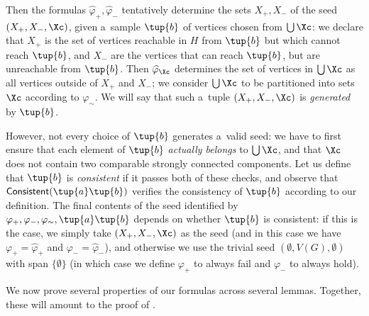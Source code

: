 Then the formulas $\widehat{\varphi}_+, \widehat{\varphi}_-$ tentatively determine the sets $X_+, X_-$ of the seed $(X_+, X_-, \Xc)$, given a~sample $\tup{b}$ of vertices chosen from $\bigcup \Xc$: we declare that $X_+$ is the set of vertices reachable in $H$ from $\tup{b}$ but which cannot reach $\tup{b}$, and $X_-$ are the vertices that can reach $\tup{b}$, but are unreachable from $\tup{b}$.
Then $\widehat{\varphi}_\Xc$ determines the set of vertices in $\bigcup \Xc$ as all vertices outside of $X_+$ and $X_-$; we consider $\bigcup \Xc$ to be partitioned into sets $\Xc$ according to $\varphi_\sim$.
We will say that such a~tuple $(X_+, X_-, \Xc)$ is \emph{generated} by $\tup{b}$.

However, not every choice of $\tup{b}$ generates a~valid seed: we have to first ensure that each element of $\tup{b}$ \emph{actually belongs} to $\bigcup \Xc$, and that $\Xc$ does not contain two comparable strongly connected components.
Let us define that $\tup{b}$ is \emph{consistent} if it passes both of these checks, and observe that $\IsConsistent(\tup{a}\tup{b})$ verifies the consistency of $\tup{b}$ according to our definition.
The final contents of the seed identified by $\varphi_+, \varphi_-, \varphi_\sim, \tup{a}\tup{b}$ depends on whether $\tup{b}$ is consistent: if this is the case, we simply take $(X_+, X_-, \Xc)$ as the seed (and in this case we have $\varphi_+ = \widehat{\varphi}_+$ and $\varphi_- = \widehat{\varphi}_-$), and otherwise we use the trivial seed $(\emptyset, V(G), \emptyset)$ with span $\{\emptyset\}$ (in which case we define $\varphi_+$ to always fail and $\varphi_-$ to always hold).

We now prove several properties of our formulas across several lemmas. Together, these will amount to the proof of .

